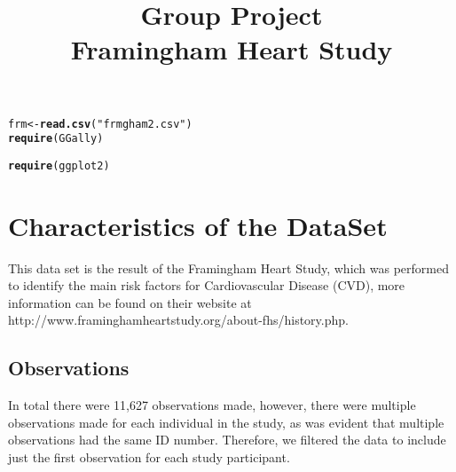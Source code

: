 \documentclass{article}\usepackage[]{graphicx}\usepackage[]{color}
\makeatletter
\newcommand{\hlstr}[1]{\textcolor[rgb]{0.192,0.494,0.8}{#1}}%
\newcommand{\hlstd}[1]{\textcolor[rgb]{0.345,0.345,0.345}{#1}}%
\newcommand{\hlkwb}[1]{\textcolor[rgb]{0.69,0.353,0.396}{#1}}%
\newcommand{\hlkwd}[1]{\textcolor[rgb]{0.737,0.353,0.396}{\textbf{#1}}}%
\newenvironment{kframe}{%
 \def\at@end@of@kframe{}%
 \ifinner\ifhmode%
  \def\at@end@of@kframe{\end{minipage}}%
  \begin{minipage}{\columnwidth}%
 \fi\fi%
 \def\FrameCommand##1{\hskip\@totalleftmargin \hskip-\fboxsep
 \colorbox{shadecolor}{##1}\hskip-\fboxsep
     \hskip-\linewidth \hskip-\@totalleftmargin \hskip\columnwidth}%
 \MakeFramed {\advance\hsize-\width
   \@totalleftmargin\z@ \linewidth\hsize
   \@setminipage}}%
 {\par\unskip\endMakeFramed%
 \at@end@of@kframe}
\newenvironment{knitrout}{}{} %
\makeatother
\begin{document}
\title{Group Project \\ Framingham Heart Study}
\author{}
\maketitle
\begin{knitrout}
\color{fgcolor}\begin{kframe}
\begin{alltt}
\hlstd{frm} \hlkwb{<-} \hlkwd{read.csv}\hlstd{(}\hlstr{"frmgham2.csv"}\hlstd{)}
\hlkwd{require}\hlstd{(GGally)}
\end{alltt}


{\ttfamily\noindent\itshape\color{messagecolor}{\#\# Loading required package: GGally\\\#\# Loading required package: ggplot2\\\#\# Loading required package: reshape\\\#\# Loading required package: plyr\\\#\# \\\#\# Attaching package: 'reshape'\\\#\# \\\#\# The following objects are masked from 'package:plyr':\\\#\# \\\#\#\ \ \ \  rename, round\_any}}\begin{alltt}
\hlkwd{require}\hlstd{(ggplot2)}
\end{alltt}
\end{kframe}
\end{knitrout}



\section{Characteristics of the DataSet}

  This data set is the result of the Framingham Heart Study, which was performed to identify the main risk factors for Cardiovascular Disease (CVD), more information can be found on their website at http://www.framinghamheartstudy.org/about-fhs/history.php.

\subsection{Observations}

In total there were 11,627 observations made, however, there were multiple observations made for each individual in the study, as was evident that multiple observations had the same ID number.  Therefore, we filtered the data to include just the first observation for each study participant.
\end{document}
